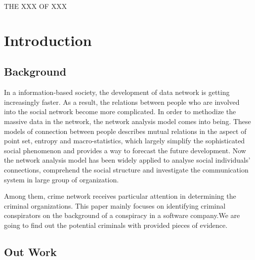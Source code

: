 \documentclass[12pt]{article}
\begin{document}
\begin{center}
\Large THE XXX OF XXX
\end{center}

\tableofcontents

\section{Introduction}
\subsection{Background}
        
        In a information-based society, the development of data network is getting increasingly faster. As a result, the relations between people who  are involved into the social network become more complicated. In order to methodize the massive data in the network, the network analysis model comes into being. These models of connection between people describes mutual relations in the aspect of point set, entropy and macro-statistics, which largely simplify  the sophisticated social phenomenon and provides a  way to forecast the future development. Now the network analysis model has been widely applied to analyse social individuals’ connections, comprehend the social structure\cite{A1}\cite{A2} and investigate the communication system in large group of organization\cite{A3}\cite{A4}.    
	
	Among them, crime network receives particular attention in  determining the criminal organizations\cite{A5}. This paper mainly focuses on identifying criminal conspirators on the background of a conspiracy in a software company.We are going to find out the potential criminals with provided pieces of evidence.
	
\subsection{Out Work}
\end{document}
